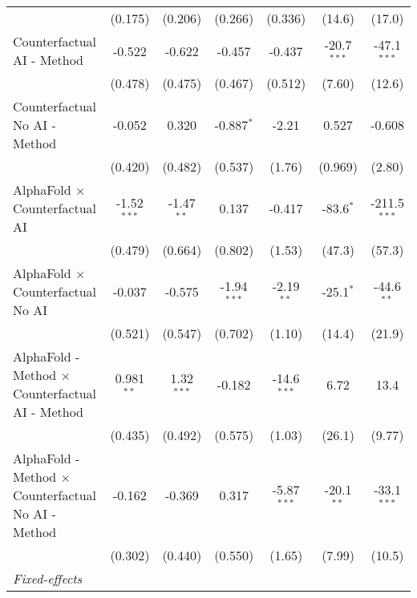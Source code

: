 \begin{tabular}{lcccccc}
                                                              & (0.175)       & (0.206)      & (0.266)       & (0.336)       & (14.6)        & (17.0)\\   
   Counterfactual AI - Method                                 & -0.522        & -0.622       & -0.457        & -0.437        & -20.7$^{***}$ & -47.1$^{***}$\\   
                                                              & (0.478)       & (0.475)      & (0.467)       & (0.512)       & (7.60)        & (12.6)\\   
   Counterfactual No AI - Method                              & -0.052        & 0.320        & -0.887$^{*}$  & -2.21         & 0.527         & -0.608\\   
                                                              & (0.420)       & (0.482)      & (0.537)       & (1.76)        & (0.969)       & (2.80)\\   
   AlphaFold $\times$ Counterfactual AI                       & -1.52$^{***}$ & -1.47$^{**}$ & 0.137         & -0.417        & -83.6$^{*}$   & -211.5$^{***}$\\   
                                                              & (0.479)       & (0.664)      & (0.802)       & (1.53)        & (47.3)        & (57.3)\\   
   AlphaFold $\times$ Counterfactual No AI                    & -0.037        & -0.575       & -1.94$^{***}$ & -2.19$^{**}$  & -25.1$^{*}$   & -44.6$^{**}$\\   
                                                              & (0.521)       & (0.547)      & (0.702)       & (1.10)        & (14.4)        & (21.9)\\   
   AlphaFold - Method $\times$ Counterfactual AI - Method     & 0.981$^{**}$  & 1.32$^{***}$ & -0.182        & -14.6$^{***}$ & 6.72          & 13.4\\   
                                                              & (0.435)       & (0.492)      & (0.575)       & (1.03)        & (26.1)        & (9.77)\\   
   AlphaFold - Method $\times$ Counterfactual No AI - Method  & -0.162        & -0.369       & 0.317         & -5.87$^{***}$ & -20.1$^{**}$  & -33.1$^{***}$\\   
                                                              & (0.302)       & (0.440)      & (0.550)       & (1.65)        & (7.99)        & (10.5)\\   
   \midrule
   \emph{Fixed-effects}\\

\end{tabular}
